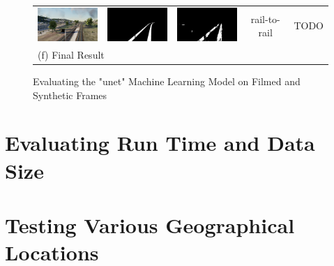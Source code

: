\begin{figure}
\begin{tabular}{ccccc}
  \includegraphics[width=30mm]{src/img/results-ml-0/par5/frame.jpg} & 
  \includegraphics[width=30mm]{src/img/results-ml-0/par5/seg.jpg} & 
  \includegraphics[width=30mm]{src/img/results-ml-0/par5/det.jpeg} &
  rail-to-rail & TODO \\
  \multicolumn{5}{l}{  (f) Final Result  } \\
  
\end{tabular}
\caption{Evaluating the "unet" Machine Learning Model on Filmed and Synthetic Frames}
\label{fig:ml-pics}

\end{figure}

\section{Evaluating Run Time and Data Size}
\label{sec:evaluate-runtime}


\section{Testing Various Geographical Locations}
\label{sec:test-locations}